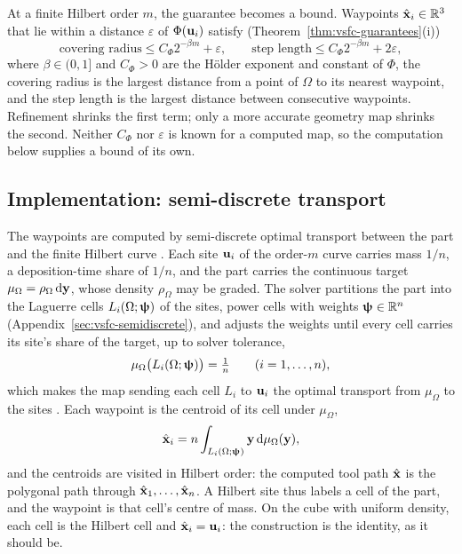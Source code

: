 At a finite Hilbert order $m$, the guarantee becomes a bound. Waypoints $\hat {\bm{\mathrm{x}}}_i\in\mathbb R^3$ that lie within a distance $\varepsilon$ of $\Phi({\bm{\mathrm{u}}}_i)$ satisfy (Theorem~\ref{thm:vsfc-guarantees}(i))
\begin{equation}
  \label{eq:main-bounds}
  \text{covering radius}\leq C_\Phi2^{-\beta m}+\varepsilon,\qquad
  \text{step length}\leq C_\Phi2^{-\beta m}+2\varepsilon ,
\end{equation}
where $\beta\in(0,1]$ and $C_\Phi>0$ are the H\"older exponent and constant of $\Phi$, the covering radius is the largest distance from a point of $\Omega$ to its nearest waypoint, and the step length is the largest distance between consecutive waypoints. Refinement shrinks the first term; only a more accurate geometry map shrinks the second. Neither $C_\Phi$ nor $\varepsilon$ is known for a computed map, so the computation below supplies a bound of its own.

\subsection{Implementation: semi-discrete transport}
\label{main:semidiscrete}
The waypoints are computed by semi-discrete optimal transport between the part and the finite Hilbert curve \cite{aurenhammer1998minkowski,merigot2011multiscale,levy2015numerical}. Each site ${\bm{\mathrm{u}}}_i$ of the order-$m$ curve carries mass $1/n$, a deposition-time share of $1/n$, and the part carries the continuous target $\mu_\Omega=\rho_\Omega\,\mathrm{d}{\bm{\mathrm{y}}}$, whose density $\rho_\Omega$ may be graded. The solver partitions the part into the Laguerre cells $L_i(\Omega;{\bm{\mathrm{\uppsi}}})$ of the sites, power cells with weights ${\bm{\mathrm{\uppsi}}}\in\mathbb R^n$ (Appendix~\ref{sec:vsfc-semidiscrete}), and adjusts the weights until every cell carries its site's share of the target, up to solver tolerance,
\begin{equation}
  \label{eq:main-equal-mass}
  \mu_\Omega\bigl(L_i(\Omega;{\bm{\mathrm{\uppsi}}})\bigr)=\tfrac1n\qquad(i=1,\dots,n),
\end{equation}
which makes the map sending each cell $L_i$ to ${\bm{\mathrm{u}}}_i$ the optimal transport from $\mu_\Omega$ to the sites \cite{aurenhammer1998minkowski,peyre2019computational}. Each waypoint is the centroid of its cell under $\mu_\Omega$,
\begin{equation}
  \label{eq:main-centroid}
  \hat {\bm{\mathrm{x}}}_i=n\int_{L_i(\Omega;{\bm{\mathrm{\uppsi}}})}{\bm{\mathrm{y}}}\,\mathrm{d}\mu_\Omega({\bm{\mathrm{y}}}) ,
\end{equation}
and the centroids are visited in Hilbert order: the computed tool path $\hat{\bm{\mathrm{x}}}$ is the polygonal path through $\hat {\bm{\mathrm{x}}}_1,\dots,\hat {\bm{\mathrm{x}}}_n$. A Hilbert site thus labels a cell of the part, and the waypoint is that cell's centre of mass. On the cube with uniform density, each cell is the Hilbert cell and $\hat {\bm{\mathrm{x}}}_i={\bm{\mathrm{u}}}_i$: the construction is the identity, as it should be.

